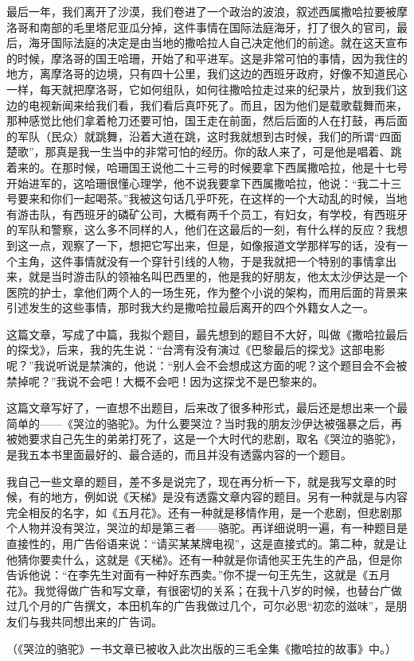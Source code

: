 \par 最后一年，我们离开了沙漠，我们卷进了一个政治的波浪，叙述西属撒哈拉要被摩洛哥和南部的毛里塔尼亚瓜分掉，这件事情在国际法庭海牙，打了很久的官司，最后，海牙国际法庭的决定是由当地的撒哈拉人自己决定他们的前途。就在这天宣布的时候，摩洛哥的国王哈珊，开始了和平进军。这是非常可怕的事情，因为我住的地方，离摩洛哥的边境，只有四十公里，我们这边的西班牙政府，好像不知道民心一样，每天就把摩洛哥，它如何组队，如何往撒哈拉走过来的纪录片，放到我们这边的电视新闻来给我们看，我们看后真吓死了。而且，因为他们是载歌载舞而来，那种感觉比他们拿着枪刀还要可怕，国王走在前面，然后后面的人在打鼓，再后面的军队（民众）就跳舞，沿着大道在跳，这时我就想到古时候，我们的所谓“四面楚歌”，那真是我一生当中的非常可怕的经历。你的敌人来了，可是他是唱着、跳着来的。在那时候，哈珊国王说他二十三号的时候要拿下西属撒哈拉，他是十七号开始进军的，这哈珊很懂心理学，他不说我要拿下西属撒哈拉，他说：“我二十三号要来和你们一起喝茶。”我被这句话几乎吓死，在这样的一个大动乱的时候，当地有游击队，有西班牙的磷矿公司，大概有两千个员工，有妇女，有学校，有西班牙的军队和警察，这么多不同样的人，他们在这最后的一刻，有什么样的反应？我想到这一点，观察了一下，想把它写出来，但是，如像报道文学那样写的话，没有一个主角，这件事情就没有一个穿针引线的人物，于是我就把一个特别的事情拿出来，就是当时游击队的领袖名叫巴西里的，他是我的好朋友，他太太沙伊达是一个医院的护士，拿他们两个人的一场生死，作为整个小说的架构，而用后面的背景来引述发生的这些事情，那时我大约是撒哈拉最后离开的四个外籍女人之一。
\par 这篇文章，写成了中篇，我拟个题目，最先想到的题目不大好，叫做《撒哈拉最后的探戈》，后来，我的先生说：“台湾有没有演过《巴黎最后的探戈》这部电影呢？”我说听说是禁演的，他说：“别人会不会想成这方面的呢？这个题目会不会被禁掉呢？”我说不会吧！大概不会吧！因为这探戈不是巴黎来的。
\par 这篇文章写好了，一直想不出题目，后来改了很多种形式，最后还是想出来一个最简单的——《哭泣的骆驼》。为什么要哭泣？当时我的朋友沙伊达被强暴之后，再被她要求自己先生的弟弟打死了，这是一个大时代的悲剧，取名《哭泣的骆驼》，是我五本书里面最好的、最合适的，而且并没有透露内容的一个题目。
\par 我自己一些文章的题目，差不多是说完了，现在再分析一下，就是我写文章的时候，有的地方，例如说《天梯》是没有透露文章内容的题目。另有一种就是与内容完全相反的名字，如《五月花》。还有一种就是移情作用，是一个悲剧，但悲剧那个人物并没有哭泣，哭泣的却是第三者——骆驼。再详细说明一遍，有一种题目是直接性的，用广告俗语来说：“请买某某牌电视”，这是直接式的。第二种，就是让他猜你要卖什么，这就是《天梯》。还有一种就是你请他买王先生的产品，但是你告诉他说：“在李先生对面有一种好东西卖。”你不提一句王先生，这就是《五月花》。我觉得做广告和写文章，有很密切的关系；在我十八岁的时候，也替台广做过几个月的广告撰文，本田机车的广告我做过几个，可尔必思“初恋的滋味”，是朋友们与我共同想出来的广告词。
\par （《哭泣的骆驼》一书文章已被收入此次出版的三毛全集《撒哈拉的故事》中。）





